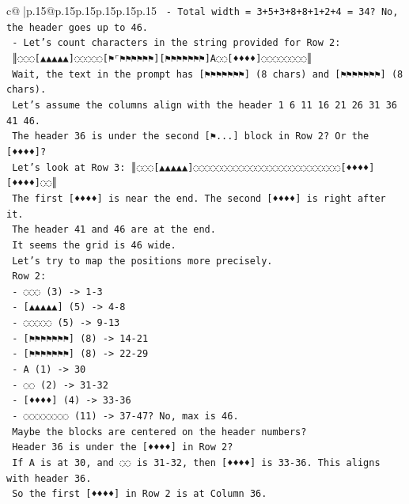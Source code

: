 \documentclass{article}
\begin{document}
{\begin{supertabular}{c@{$\;$}|p{.15\linewidth}@{}p{.15\linewidth}p{.15\linewidth}p{.15\linewidth}p{.15\linewidth}p{.15\linewidth}}
{{{\texttt{  {-} Total width = 3+5+3+8+8+1+2+4 = 34? No, the header goes up to 46.} \\
\texttt{  {-} Let's count characters in the string provided for Row 2:} \\
\texttt{    ║◌◌◌{[}▲▲▲▲▲{]}◌◌◌◌◌{[}⚑⌜⚑⚑⚑⚑⚑⚑{]}{[}⚑⚑⚑⚑⚑⚑⚑{]}A◌◌{[}♦♦♦♦{]}◌◌◌◌◌◌◌◌║} \\
\texttt{    Wait, the text in the prompt has {[}⚑⚑⚑⚑⚑⚑⚑{]} (8 chars) and {[}⚑⚑⚑⚑⚑⚑⚑{]} (8 chars).} \\
\texttt{    Let's assume the columns align with the header 1 6 11 16 21 26 31 36 41 46.} \\
\texttt{    The header 36 is under the second {[}⚑...{]} block in Row 2? Or the {[}♦♦♦♦{]}?} \\
\texttt{    Let's look at Row 3: ║◌◌◌{[}▲▲▲▲▲{]}◌◌◌◌◌◌◌◌◌◌◌◌◌◌◌◌◌◌◌◌◌◌◌◌◌◌{[}♦♦♦♦{]}{[}♦♦♦♦{]}◌◌║} \\
\texttt{    The first {[}♦♦♦♦{]} is near the end. The second {[}♦♦♦♦{]} is right after it.} \\
\texttt{    The header 41 and 46 are at the end.} \\
\texttt{    It seems the grid is 46 wide.} \\
\texttt{    Let's try to map the positions more precisely.} \\
\texttt{    Row 2:} \\
\texttt{    {-} ◌◌◌ (3) {-}> 1{-}3} \\
\texttt{    {-} {[}▲▲▲▲▲{]} (5) {-}> 4{-}8} \\
\texttt{    {-} ◌◌◌◌◌ (5) {-}> 9{-}13} \\
\texttt{    {-} {[}⚑⚑⚑⚑⚑⚑⚑{]} (8) {-}> 14{-}21} \\
\texttt{    {-} {[}⚑⚑⚑⚑⚑⚑⚑{]} (8) {-}> 22{-}29} \\
\texttt{    {-} A (1) {-}> 30} \\
\texttt{    {-} ◌◌ (2) {-}> 31{-}32} \\
\texttt{    {-} {[}♦♦♦♦{]} (4) {-}> 33{-}36} \\
\texttt{    {-} ◌◌◌◌◌◌◌◌ (11) {-}> 37{-}47? No, max is 46.} \\
\texttt{    Maybe the blocks are centered on the header numbers?} \\
\texttt{    Header 36 is under the {[}♦♦♦♦{]} in Row 2?} \\
\texttt{    If A is at 30, and ◌◌ is 31{-}32, then {[}♦♦♦♦{]} is 33{-}36. This aligns with header 36.} \\
\texttt{    So the first {[}♦♦♦♦{]} in Row 2 is at Column 36.} \\
}}}
\end{supertabular}}
\end{document}
